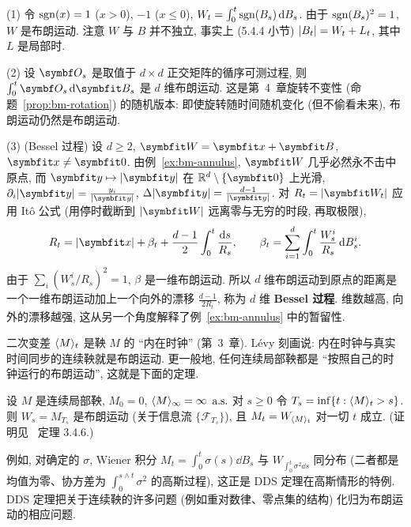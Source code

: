 \begin{example}\label{ex:levy-applications}
(1) 令 $\operatorname{sgn}(x)=1$ ($x>0$), $-1$ ($x\le0$), $W_t=\int_0^t\operatorname{sgn}(B_s)\mathop{}\!\mathrm{d} B_s$. 由于 $\operatorname{sgn}(B_s)^2=1$, $W$ 是布朗运动. 注意 $W$ 与 $B$ 并不独立, 事实上 (5.4.4 小节) $\lvert B_t\rvert=W_t+L_t$, 其中 $L$ 是局部时.

(2) 设 $\mat{O}_s$ 是取值于 $d\times d$ 正交矩阵的循序可测过程, 则 $\int_0^t\mat{O}_s\dd\rvec{B}_s$ 是 $d$ 维布朗运动. 这是第~4~章旋转不变性 (命题~\ref{prop:bm-rotation}) 的随机版本: 即使旋转随时间随机变化 (但不偷看未来), 布朗运动仍然是布朗运动.

(3) (Bessel 过程) 设 $d\ge2$, $\rvec{W}=\rvec{x}+\rvec{B}$, $\rvec{x}\ne\rvec{0}$. 由例~\ref{ex:bm-annulus}, $\rvec{W}$ 几乎必然永不击中原点, 而 $\rvec{y}\mapsto\abs{\rvec{y}}$ 在 $\R^d\setminus\{\rvec{0}\}$ 上光滑, $\partial_i\abs{\rvec{y}}=\frac{y_i}{\abs{\rvec{y}}}$, $\Delta\abs{\rvec{y}}=\frac{d-1}{\abs{\rvec{y}}}$. 对 $R_t=\abs{\rvec{W}_t}$ 应用 It\^o 公式 (用停时截断到 $\abs{\rvec{W}}$ 远离零与无穷的时段, 再取极限),
\[
R_t=\abs{\rvec{x}}+\beta_t+\frac{d-1}{2}\int_0^t\frac{\dd s}{R_s},\qquad\beta_t=\sum_{i=1}^d\int_0^t\frac{W^i_s}{R_s}\dd B^i_s.
\]
由于 $\sum_i(W^i_s/R_s)^2=1$, $\beta$ 是一维布朗运动. 所以 $d$ 维布朗运动到原点的距离是一个一维布朗运动加上一个向外的漂移 $\frac{d-1}{2R_t}$, 称为 $d$ 维 \textbf{Bessel 过程}. 维数越高, 向外的漂移越强, 这从另一个角度解释了例~\ref{ex:bm-annulus} 中的暂留性.
\end{example}

\begin{intuition}
二次变差 $\langle M\rangle_t$ 是鞅 $M$ 的 ``内在时钟'' (第~3~章). L\'evy 刻画说: 内在时钟与真实时间同步的连续鞅就是布朗运动. 更一般地, 任何连续局部鞅都是 ``按照自己的时钟运行的布朗运动'', 这就是下面的定理.
\end{intuition}

\begin{theorem}\label{thm:dds}
设 $M$ 是连续局部鞅, $M_0=0$, $\langle M\rangle_\infty=\infty$ $\text{a.s.}$ 对 $s\ge0$ 令 $T_s=\inf\{t:\langle M\rangle_t>s\}$. 则 $W_s=M_{T_s}$ 是布朗运动 (关于信息流 $\{\mathcal{F}_{T_s}\}$), 且 $M_t=W_{\langle M\rangle_t}$ 对一切 $t$ 成立. (证明见~\cite{karatzas} 定理 3.4.6.)
\end{theorem}

例如, 对确定的 $\sigma$, Wiener 积分 $M_t=\int_0^t\sigma(s)\dd B_s$ 与 $W_{\int_0^t\sigma^2\dd s}$ 同分布 (二者都是均值为零、协方差为 $\int_0^{s\wedge t}\sigma^2$ 的高斯过程), 这正是 DDS 定理在高斯情形的特例. DDS 定理把关于连续鞅的许多问题 (例如重对数律、零点集的结构) 化归为布朗运动的相应问题.

